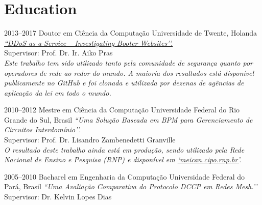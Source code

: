\documentclass[print]{styles/friggeri-cv-mac} %
\begin{document}


\setlength\parindent{0pt}
\section{Education}\vspace{-5pt}

\begin{entrylist}


\entry
{2013--2017}
{Doutor {\normalfont em Ciência da Computação}}
{Universidade de Twente, Holanda}
{\emph{\href{https://research.utwente.nl/files/18494043/jjsantanna_thesis.pdf}{``DDoS-as-a-Service -- Investigating Booter Websites’’.}} \\
	Supervisor: Prof. Dr. Ir. Aiko Pras\\
	\textit{Este trabalho tem sido utilizado tanto pela comunidade de segurança quanto por operadores de rede ao redor do mundo. A maioria dos resultados está disponível publicamente no GitHub e foi clonada e utilizada por dezenas de agências de aplicação da lei em todo o mundo.}}

\entry
{2010--2012}
{Mestre {\normalfont em Ciência da Computação}}
{Universidade Federal do Rio Grande do Sul, Brasil}
{\emph{``Uma Solução Baseada em BPM para Gerenciamento de Circuitos Interdomínio’’.}\\
	Supervisor: Prof. Dr. Lisandro Zambenedetti Granville\\
	\textit{O resultado deste trabalho ainda está em produção, sendo utilizado pela Rede Nacional de Ensino e Pesquisa (RNP) e disponível em \href{http://meican.cipo.rnp.br/}{`meican.cipo.rnp.br’}.}}

\entry
{2005--2010}
{Bacharel {\normalfont em Engenharia da Computação}}
{Universidade Federal do Pará, Brasil}
{\emph{``Uma Avaliação Comparativa do Protocolo DCCP em Redes Mesh.’’} \\
	Supervisor: Dr. Kelvin Lopes Dias
}

\end{entrylist}

\newpage
\end{document}

